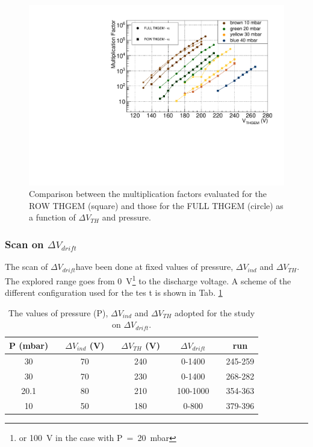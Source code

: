 \documentclass[a4paper, 11 pt]{report}
\newcommand{\Vind}{$\Delta V_{ind}$}
\newcommand{\Vthgem}{$\Delta V_{TH}$}
\newcommand{\Vdrift}{$ \Delta V_{drift}$}
\begin{document}
\begin{figure}[!t]
	\centering
	\includegraphics[width=\textwidth]{Immagini/MF_ALL_THGEM_noBeam.pdf}
	\caption{Comparison between the multiplication factors evaluated for the ROW THGEM (square) and 
	those for the FULL THGEM (circle) as a function of \Vthgem{} and pressure.}
	\label{fig:multiplication_factor_FULLandROW}
\end{figure}


\clearpage

\subsubsection{Scan on \Vdrift}
The scan of \Vdrift have been done at fixed values of pressure, \Vind{} and \Vthgem{}.
The explored range goes from 0~V\footnote{or 100~V in the case with P~=~20~mbar} to the discharge
voltage. A scheme of the different configuration used for the tes t is shown in Tab.
\ref{tab:ROWTHGEM_vdrift}
\begin{table} [!h]
	\begin{center}
		\renewcommand{\arraystretch}{1.2}
		\begin{tabular} {ccccccccc}
			P (mbar) & & \Vind{} (V) & & \Vthgem{} (V)& & \Vdrift & & run\\
			\toprule[0.1em]
			30		& &	70	& &	240 & & 0-1400 & & 245-259\\
			30		& &	70	& & 230 & & 0-1400 & & 268-282\\
			20.1	& & 80	& & 210 & & 100-1000 & & 354-363\\
			10		& & 50	& & 180 & & 0-800 & & 379-396\\
			\bottomrule[0.1em]
		\end{tabular}
	\end{center}
	\caption{The values of pressure (P), \Vind{} and \Vthgem{} adopted for the study on \Vdrift.} \label{tab:ROWTHGEM_vdrift}
\end{table}
\end{document}
